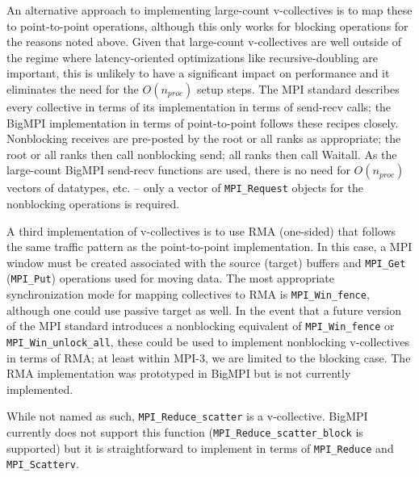 
An alternative approach to implementing large-count v-collectives is to map
these to point-to-point operations, although this only works for blocking operations
for the reasons noted above.
Given that large-count v-collectives are well outside of the regime where latency-oriented 
optimizations like recursive-doubling are important, this is unlikely to have a significant impact 
on performance and it eliminates the need for the $O(n_{proc})$ setup steps.
The MPI standard describes every collective in terms of its implementation 
in terms of send-recv calls; the BigMPI implementation in terms of point-to-point
follows these recipes closely.
Nonblocking receives are pre-posted by the root or all ranks as appropriate;
the root or all ranks then call nonblocking send; all ranks then call Waitall.
As the large-count BigMPI send-recv functions are used, there is no need for
$O(n_{proc})$ vectors of datatypes, etc. -- only a vector of \texttt{MPI\_Request}
objects for the nonblocking operations is required.

A third implementation of v-collectives is to use RMA (one-sided) that follows
the same traffic pattern as the point-to-point implementation.
In this case, a MPI window must be created associated with the source (target)
buffers and \texttt{MPI\_Get} (\texttt{MPI\_Put}) operations used for moving data.
The most appropriate synchronization mode for mapping collectives to RMA
is \texttt{MPI\_Win\_fence}, although one could use passive target as well.
In the event that a future version of the MPI standard introduces a nonblocking
equivalent of \texttt{MPI\_Win\_fence} or \texttt{MPI\_Win\_unlock\_all}, these
could be used to implement nonblocking v-collectives in terms of RMA; 
at least within MPI-3, we are limited to the blocking case.
The RMA implementation was prototyped in BigMPI but is not currently implemented.

While not named as such, \texttt{MPI\_Reduce\_scatter} is a v-collective.
BigMPI currently does not support this function
(\texttt{MPI\_Reduce\_scatter\_block} is supported)
but it is straightforward to implement in terms of  \texttt{MPI\_Reduce} and
\texttt{MPI\_Scatterv}.

